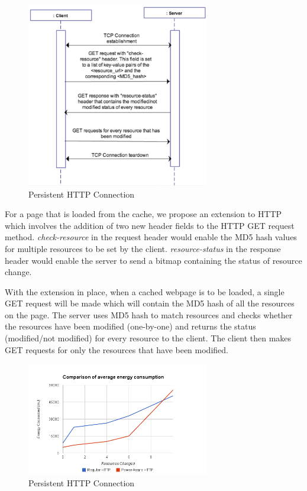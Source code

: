 \documentclass{sigplanconf}
\begin{document}
\begin{figure}[ht!]
\centering
\includegraphics[width=80mm]{proposal}
\caption{Persistent HTTP Connection }
\label{fig:sp_gd_mnist}
\end{figure}

For a page that is loaded from the cache, we propose an extension to HTTP which involves the addition of two new header fields to the HTTP GET request method. {\it check-resource} in the request header would enable the MD5 hash values for multiple resources to be set by the client. {\it resource-status} in the response header would enable the server to send a bitmap containing the status of resource change.

With the extension in place, when a cached webpage is to be loaded, a single GET request will be made which will contain the MD5 hash of all the resources on the page. The server uses MD5 hash to match resources and checks whether the resources have been modified (one-by-one) and returns the status (modified/not modified) for every resource to the client. The client then makes GET requests for only the resources that have been modified.


\begin{figure}[ht!]
\centering
\includegraphics[width=80mm]{avg_energy_cell.png}
\caption{Persistent HTTP Connection }
\label{fig:sp_gd_mnist}
\end{figure}
\end{document}
